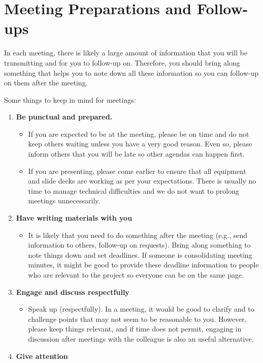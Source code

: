\documentclass[
]{book}
\providecommand{\tightlist}{%
  \setlength{\itemsep}{0pt}\setlength{\parskip}{0pt}}
\begin{document}
\hypertarget{meeting-preparations-and-follow-ups}{%
\chapter{\texorpdfstring{\textbf{Meeting Preparations and Follow-ups}}{Meeting Preparations and Follow-ups}}\label{meeting-preparations-and-follow-ups}}

In each meeting, there is likely a large amount of information that you will be transmitting and for you to follow-up on. Therefore, you should bring along something that helps you to note down all these information so you can follow-up on them after the meeting.

Some things to keep in mind for meetings:

\begin{enumerate}
\def\labelenumi{\arabic{enumi}.}
\item
  \textbf{Be punctual and prepared.}

  \begin{itemize}
  \item
    If you are expected to be at the meeting, please be on time and do not keep others waiting unless you have a very good reason. Even so, please inform others that you will be late so other agendas can happen first.
  \item
    If you are presenting, please come earlier to ensure that all equipment and slide decks are working as per your expectations. There is usually no time to manage technical difficulties and we do not want to prolong meetings unnecessarily.
  \end{itemize}
\item
  \textbf{Have writing materials with you}

  \begin{itemize}
  \tightlist
  \item
    It is likely that you need to do something after the meeting (e.g., send information to others, follow-up on requests). Bring along something to note things down and set deadlines. If someone is consolidating meeting minutes, it might be good to provide these deadline information to people who are relevant to the project so everyone can be on the same page.
  \end{itemize}
\item
  \textbf{Engage and discuss respectfully}

  \begin{itemize}
  \tightlist
  \item
    Speak up (respectfully). In a meeting, it would be good to clarify and to challenge points that may not seem to be reasonable to you. However, please keep things relevant, and if time does not permit, engaging in discussion after meetings with the colleague is also an useful alternative.
  \end{itemize}
\item
  \textbf{Give attention}


\end{enumerate}
\end{document}
